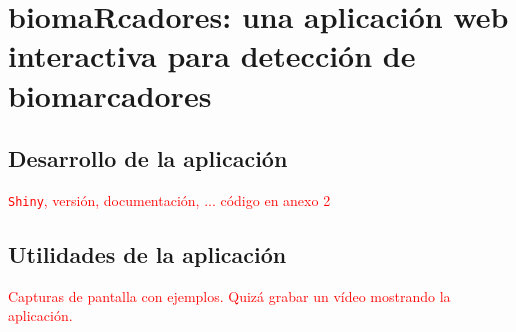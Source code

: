 \chapter{biomaRcadores: una aplicación web interactiva para detección de biomarcadores}

\section{Desarrollo de la aplicación}

\textcolor{red}{\texttt{Shiny}, versión, documentación, ... código en anexo 2}

\section{Utilidades de la aplicación}

\textcolor{red}{Capturas de pantalla con ejemplos. Quizá grabar un vídeo mostrando la aplicación.}